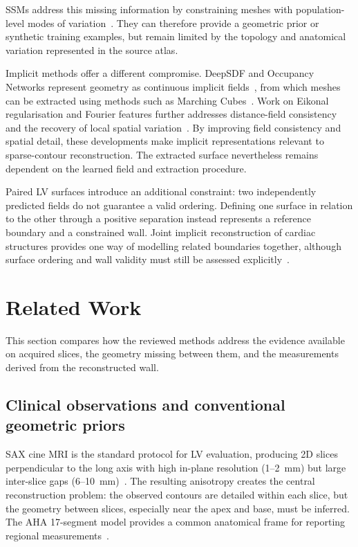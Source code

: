 SSMs address this missing information by constraining meshes
with population-level modes of variation~\parencite{cootes1995asm,heimann2009ssmreview}. They can therefore provide a
geometric prior or synthetic training examples, but remain limited by the
topology and anatomical variation represented in the source atlas.

Implicit methods offer a different compromise. DeepSDF and Occupancy Networks
represent geometry as continuous implicit fields~\parencite{occupancynetworks2019,deepsdf2019}, from which meshes can be extracted
using methods such as Marching Cubes~\parencite{lorensen1987marchingcubes}.
Work on Eikonal regularisation and Fourier features further addresses distance-field
consistency and the recovery of local spatial variation~\parencite{gropp2020igr,tancik2020fourierfeatures}. By improving field
consistency and spatial detail, these developments make implicit representations
relevant to sparse-contour reconstruction. The extracted surface nevertheless
remains dependent on the learned field and extraction procedure.

Paired LV surfaces introduce an additional constraint: two independently
predicted fields do not guarantee a valid ordering. Defining one surface in
relation to the other through a positive separation instead represents a
reference boundary and a constrained wall. Joint implicit reconstruction of
cardiac structures provides one way of modelling related boundaries together,
although surface ordering and wall validity must still be assessed explicitly~\parencite{bras2026anisotropy}.

\section{Related Work}
\label{sec:related-work}

\noindent
This section compares how the reviewed methods address the evidence available
on acquired slices, the geometry missing between them, and the measurements
derived from the reconstructed wall.

\subsection{Clinical observations and conventional geometric priors}
\label{subsec:conventional-reconstruction}

\noindent
SAX cine MRI is the standard protocol for LV
evaluation, producing 2D slices perpendicular to the long axis with high
in-plane resolution (1--2~mm) but large inter-slice gaps (6--10~mm)~\parencite{petitjean2011segmentationreview}. The
resulting anisotropy creates the central reconstruction problem: the observed
contours are detailed within each slice, but the geometry between slices,
especially near the apex and base, must be inferred. The AHA 17-segment
model provides a common anatomical frame for reporting regional measurements~\parencite{cerqueira2002segmentation}.


